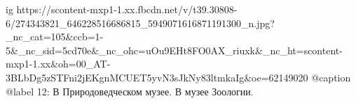  
 
 
 
 

\ifcmt
  ig https://scontent-mxp1-1.xx.fbcdn.net/v/t39.30808-6/274343821_646228516686815_5949071616871191300_n.jpg?_nc_cat=105&ccb=1-5&_nc_sid=5cd70e&_nc_ohc=uOu9EHt8FO0AX_riuxk&_nc_ht=scontent-mxp1-1.xx&oh=00_AT-3BLbDg5zSTFni2jEKgnMCUET5yvN3sJkNy83ltmkaIg&oe=62149020
  @caption @label 12: В Природоведческом музее. В музее Зоологии.
\fi
